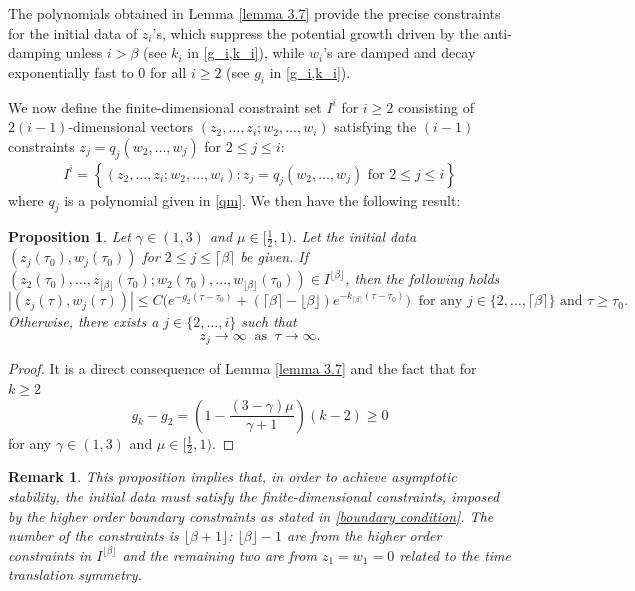 \documentclass{article}
\newcommand{\ga}{\gamma}
\def\be{\begin{equation}}
\def\ee{\end{equation}}
\def\beqa{\begin{equation}\begin{aligned}}
\def\eeqa{\end{aligned}\end{equation}}
\numberwithin{equation}{section}
\newtheorem{remark}[theorem]{Remark}
\newtheorem{proposition}[theorem]{Proposition}
\begin{document}
The polynomials obtained in Lemma \ref{lemma 3.7} provide the precise constraints for the initial data of $z_i$'s, which suppress the potential growth driven by the anti-damping unless $i>\beta$ (see $k_i$ in  \eqref{g_i,k_i}), while $w_i$'s are damped and decay exponentially fast to 0 for all $i\ge 2$ (see $g_i$ in  \eqref{g_i,k_i}). 


We now define the finite-dimensional constraint set $I^i$ for $i\ge 2$  consisting of $2(i-1)$-dimensional vectors $(z_2, \dots, z_i; w_2,\dots, w_i)$ satisfying the $(i-1)$ constraints $z_j= q_j (w_2, \dots,w_j)$ for $2\le j\le i$: 
\beqa\label{boundary condition}
  I^i = \left\{ (z_2, \dots, z_i; w_2,\dots, w_i): z_j= q_j (w_2, \dots,w_j) \text{ for  } 2\le j \le i  \right\}
\eeqa
where $q_j$ is a polynomial given in \eqref{qm}.
We then have the following result:
\begin{proposition}\label{trapping}
    Let $\ga\in(1,3)$ and $\mu\in[\frac12,1)$. Let the initial data $(z_j(\tau_0), w_j(\tau_0))$ for $2\le j\le \lceil \beta \rceil$ be given. If $(z_2(\tau_0), \dots, z_{\lfloor \beta \rfloor}(\tau_0); w_2(\tau_0),\dots, w_{\lfloor \beta \rfloor} (\tau_0)) \in I^{\lfloor \beta \rfloor} $,    
   then the following holds
    \be\label{3.38}
        |(z_j(\tau),w_j(\tau)) |\leq C\Big( e^{-g_2 (\tau-\tau_0)}+(\lceil \beta \rceil-\lfloor\beta\rfloor)e^{-k_{\lceil \beta \rceil} (\tau-\tau_0)} \Big)\ \text{ for any } j\in\{2, \dots, \lceil \beta \rceil\}\text{ and }\tau\geq\tau_0.
    \ee
    Otherwise, there exists a $j\in\{2, \dots, i\}$ such that
    \be
        z_j\to \infty \ \text{ as } \ \tau\to\infty.
    \ee
\end{proposition}
\begin{proof}
    It is a direct consequence of Lemma \ref{lemma 3.7} and the fact that for $k\geq 2$
    \[
        g_k -g_2 = (1-\frac{(3-\ga)\mu}{\ga+1})(k-2) \geq 0
    \]
    for any $\ga\in(1,3)$ and $\mu\in[\frac12,1)$.
\end{proof}
\begin{remark}\label{remark 3.7}
    This proposition implies that, in order to achieve asymptotic stability, the initial data must satisfy the finite-dimensional constraints, 
    imposed by the higher order boundary constraints as stated in \eqref{boundary condition}. The number of the constraints is $\lfloor \beta+1 \rfloor$: $\lfloor \beta \rfloor - 1$ are from the higher order constraints in $I^{\lfloor \beta\rfloor}$ and the remaining two are from $z_1=w_1=0$ related to the time translation symmetry. 
\end{remark}
\end{document}
